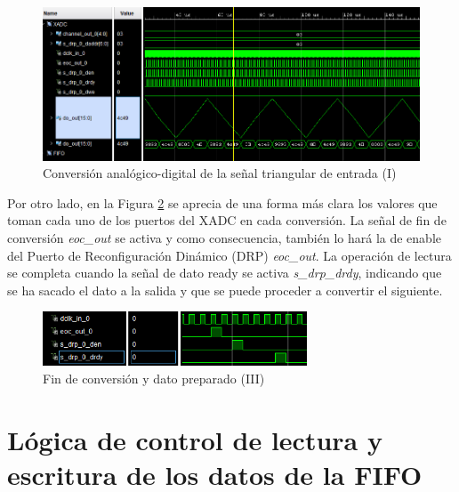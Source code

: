 \vspace{3mm}

\begin{figure}[h]
    \centering
    \includegraphics[width=1\textwidth]{img/simu/xadc.PNG}
    \caption{Conversión analógico-digital de la señal triangular de entrada (I)}
    \label{fig:xadc}
\end{figure}

\vspace{3mm}

Por otro lado, en la Figura \ref{fig:xadc2} se aprecia de una forma más clara los valores que toman cada uno de los puertos del XADC en cada conversión. La señal de fin de conversión \textit{eoc\_out} se activa y como consecuencia, también lo hará la de enable del Puerto de Reconfiguración Dinámico (DRP) \textit{eoc\_out}. La operación de lectura se completa cuando la señal de dato ready se activa \textit{s\_drp\_drdy}, indicando que se ha sacado el dato a la salida y que se puede proceder a convertir el siguiente.

\vspace{3mm}

\begin{figure}[h]
    \centering
    \includegraphics[width=0.7\textwidth]{img/simu/xadc2.PNG}
    \caption{Fin de conversión y dato preparado (III)}
    \label{fig:xadc2}
\end{figure}

\vspace{3mm}

\section{Lógica de control de lectura y escritura de los datos de la FIFO}

